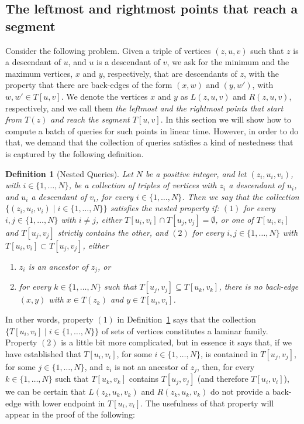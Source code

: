 \documentclass[11pt,a4paper]{article}
\newtheorem{definition}[theorem]{Definition}
\begin{document}
\subsection{The leftmost and rightmost points that reach a segment}
\label{section:leftmostReachSegment}
Consider the following problem. Given a triple of vertices $(z,u,v)$ such that $z$ is a descendant of $u$, and $u$ is a descendant of $v$, we ask for the minimum and the maximum vertices, $x$ and $y$, respectively, that are descendants of $z$, with the property that there are back-edges of the form $(x,w)$ and $(y,w')$, with $w,w'\in T[u,v]$. We denote the vertices $x$ and $y$ as $L(z,u,v)$ and $R(z,u,v)$, respectively, and we call them \emph{the leftmost and the rightmost points that start from $T(z)$ and reach the segment $T[u,v]$}. In this section we will show how to compute a batch of queries for such points in linear time. However, in order to do that, we demand that the collection of queries satisfies a kind of nestedness that is captured by the following definition.

\begin{definition}[Nested Queries]
\label{definition:nestedqueries}
\normalfont
Let $N$ be a positive integer, and let $(z_i,u_i,v_i)$, with $i\in\{1,\dots,N\}$, be a collection of triples of vertices with $z_i$ a descendant of $u_i$, and $u_i$ a descendant of $v_i$, for every $i\in\{1,\dots,N\}$. Then we say that the collection $\{(z_i,u_i,v_i)\mid i\in\{1,\dots,N\}\}$ satisfies the nested property if: $(1)$ for every $i,j\in\{1,\dots,N\}$ with $i\neq j$, either $T[u_i,v_i]\cap T[u_j,v_j]=\emptyset$, or one of $T[u_i,v_i]$ and $T[u_j,v_j]$ strictly contains the other, and $(2)$ for every $i,j\in\{1,\dots,N\}$ with $T[u_i,v_i]\subset T[u_j,v_j]$, either
\begin{enumerate}[label={(\roman*)}]
\item{$z_i$ is an ancestor of $z_j$, or}
\item{for every $k\in\{1,\dots,N\}$ such that $T[u_j,v_j]\subseteq T[u_k,v_k]$, there is no back-edge $(x,y)$ with $x\in T(z_k)$ and $y\in T[u_i,v_i]$.}
\end{enumerate}
\end{definition}

In other words, property $(1)$ in Definition~\ref{definition:nestedqueries} says that the collection $\{T[u_i,v_i]\mid i\in\{1,\dots,N\}\}$ of sets of vertices constitutes a laminar family. Property $(2)$ is a little bit more complicated, but in essence it says that, if we have established that $T[u_i,v_i]$, for some $i\in\{1,\dots,N\}$, is contained in $T[u_j,v_j]$, for some $j\in\{1,\dots,N\}$, and $z_i$ is not an ancestor of $z_j$, then, for every $k\in\{1,\dots,N\}$ such that $T[u_k,v_k]$ contains $T[u_j,v_j]$ (and therefore $T[u_i,v_i]$), we can be certain that $L(z_k,u_k,v_k)$ and $R(z_k,u_k,v_k)$ do not provide a back-edge with lower endpoint in $T[u_i,v_i]$. The usefulness of that property will appear in the proof of the following: 
\end{document}
